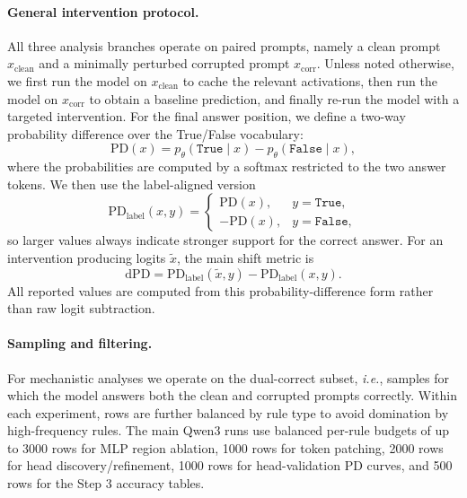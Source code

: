 \documentclass[11pt]{article}
\begin{document}
\paragraph{General intervention protocol.}
All three analysis branches operate on paired prompts, namely a clean prompt $x_{\mathrm{clean}}$ and a minimally perturbed corrupted prompt $x_{\mathrm{corr}}$. Unless noted otherwise, we first run the model on $x_{\mathrm{clean}}$ to cache the relevant activations, then run the model on $x_{\mathrm{corr}}$ to obtain a baseline prediction, and finally re-run the model with a targeted intervention. For the final answer position, we define a two-way probability difference over the True/False vocabulary:
\begin{equation}
\mathrm{PD}(x) = p_{\theta}(\texttt{True}\mid x) - p_{\theta}(\texttt{False}\mid x),
\end{equation}
where the probabilities are computed by a softmax restricted to the two answer tokens. We then use the label-aligned version
\begin{equation}
\mathrm{PD}_{\mathrm{label}}(x, y) =
\begin{cases}
\mathrm{PD}(x), & y = \texttt{True},\\
-\mathrm{PD}(x), & y = \texttt{False},
\end{cases}
\end{equation}
so larger values always indicate stronger support for the correct answer. For an intervention producing logits $\tilde{x}$, the main shift metric is
\begin{equation}
\mathrm{dPD} = \mathrm{PD}_{\mathrm{label}}(\tilde{x}, y) - \mathrm{PD}_{\mathrm{label}}(x, y).
\end{equation}
All reported values are computed from this probability-difference form rather than raw logit subtraction.

\paragraph{Sampling and filtering.}
For mechanistic analyses we operate on the dual-correct subset, \textit{i.e.}, samples for which the model answers both the clean and corrupted prompts correctly. Within each experiment, rows are further balanced by rule type to avoid domination by high-frequency rules. The main Qwen3 runs use balanced per-rule budgets of up to 3000 rows for MLP region ablation, 1000 rows for token patching, 2000 rows for head discovery/refinement, 1000 rows for head-validation PD curves, and 500 rows for the Step 3 accuracy tables.
\end{document}
